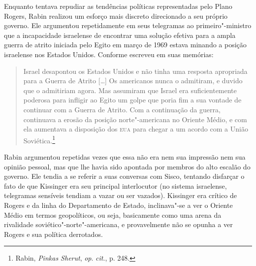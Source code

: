 Enquanto tentava repudiar as tendências políticas representadas pelo
Plano Rogers, Rabin realizou um esforço mais discreto direcionado a seu
próprio governo. Ele argumentou repetidamente em seus telegramas ao
primeiro"-ministro que a incapacidade israelense de encontrar uma solução
efetiva para a ampla guerra de atrito iniciada pelo Egito em março de
1969 estava minando a posição israelense nos Estados Unidos. Conforme
escreveu em suas memórias: 

\begin{quote}
Israel desapontou os Estados Unidos e não
tinha uma resposta apropriada para a Guerra de Atrito {[}\ldots{}{]} Os americanos
nunca o admitiram, e duvido que o admitiriam agora. Mas assumiram que
Israel era suficientemente poderosa para infligir ao Egito um golpe que
poria fim a sua vontade de continuar com a Guerra de Atrito. Com a
continuação da guerra, continuava a erosão da posição norte"-americana no
Oriente Médio, e com ela aumentava a disposição dos \textsc{eua} para chegar a um
acordo com a União Soviética.\footnote{Rabin, \emph{Pinkas Sherut}, 
\emph{op}. \emph{cit}., p. 248.}
\end{quote}

Rabin argumentou repetidas vezes que essa não era nem sua impressão nem
sua opinião pessoal, mas que lhe havia sido apontada por membros do alto
escalão do governo. Ele tendia a se referir a suas conversas com Sisco,
tentando disfarçar o fato de que Kissinger era seu principal
interlocutor (no sistema israelense, telegramas sensíveis tendiam a
vazar ou ser vazados). Kissinger era crítico de Rogers e da linha do
Departamento de Estado, inclinava"-se a ver o Oriente Médio em termos
geopolíticos, ou seja, basicamente como uma arena da rivalidade
soviético"-norte"-americana, e provavelmente não se opunha a ver
Rogers e sua política derrotados.

